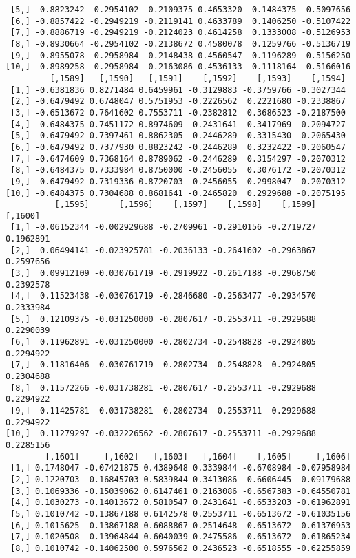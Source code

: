 \documentclass[
  letterpaper,
  DIV=11,
  numbers=noendperiod]{scrreprt}
\begin{document}
\begin{verbatim}
 [5,] -0.8823242 -0.2954102 -0.2109375 0.4653320  0.1484375 -0.5097656
 [6,] -0.8857422 -0.2949219 -0.2119141 0.4633789  0.1406250 -0.5107422
 [7,] -0.8886719 -0.2949219 -0.2124023 0.4614258  0.1333008 -0.5126953
 [8,] -0.8930664 -0.2954102 -0.2138672 0.4580078  0.1259766 -0.5136719
 [9,] -0.8955078 -0.2958984 -0.2148438 0.4560547  0.1196289 -0.5156250
[10,] -0.8989258 -0.2958984 -0.2163086 0.4536133  0.1118164 -0.5166016
         [,1589]   [,1590]   [,1591]    [,1592]    [,1593]    [,1594]
 [1,] -0.6381836 0.8271484 0.6459961 -0.3129883 -0.3759766 -0.3027344
 [2,] -0.6479492 0.6748047 0.5751953 -0.2226562  0.2221680 -0.2338867
 [3,] -0.6513672 0.7641602 0.7553711 -0.2382812  0.3686523 -0.2187500
 [4,] -0.6484375 0.7451172 0.8974609 -0.2431641  0.3417969 -0.2094727
 [5,] -0.6479492 0.7397461 0.8862305 -0.2446289  0.3315430 -0.2065430
 [6,] -0.6479492 0.7377930 0.8823242 -0.2446289  0.3232422 -0.2060547
 [7,] -0.6474609 0.7368164 0.8789062 -0.2446289  0.3154297 -0.2070312
 [8,] -0.6484375 0.7333984 0.8750000 -0.2456055  0.3076172 -0.2070312
 [9,] -0.6479492 0.7319336 0.8720703 -0.2456055  0.2998047 -0.2070312
[10,] -0.6484375 0.7304688 0.8681641 -0.2465820  0.2929688 -0.2075195
          [,1595]      [,1596]    [,1597]    [,1598]    [,1599]   [,1600]
 [1,] -0.06152344 -0.002929688 -0.2709961 -0.2910156 -0.2719727 0.1962891
 [2,]  0.06494141 -0.023925781 -0.2036133 -0.2641602 -0.2963867 0.2597656
 [3,]  0.09912109 -0.030761719 -0.2919922 -0.2617188 -0.2968750 0.2392578
 [4,]  0.11523438 -0.030761719 -0.2846680 -0.2563477 -0.2934570 0.2333984
 [5,]  0.12109375 -0.031250000 -0.2807617 -0.2553711 -0.2929688 0.2290039
 [6,]  0.11962891 -0.031250000 -0.2802734 -0.2548828 -0.2924805 0.2294922
 [7,]  0.11816406 -0.030761719 -0.2802734 -0.2548828 -0.2924805 0.2304688
 [8,]  0.11572266 -0.031738281 -0.2807617 -0.2553711 -0.2929688 0.2294922
 [9,]  0.11425781 -0.031738281 -0.2802734 -0.2553711 -0.2929688 0.2294922
[10,]  0.11279297 -0.032226562 -0.2807617 -0.2553711 -0.2929688 0.2285156
        [,1601]     [,1602]   [,1603]   [,1604]    [,1605]     [,1606]
 [1,] 0.1748047 -0.07421875 0.4389648 0.3339844 -0.6708984 -0.07958984
 [2,] 0.1220703 -0.16845703 0.5839844 0.3413086 -0.6606445  0.09179688
 [3,] 0.1069336 -0.15039062 0.6147461 0.2163086 -0.6567383 -0.64550781
 [4,] 0.1030273 -0.14013672 0.5810547 0.2431641 -0.6533203 -0.61962891
 [5,] 0.1010742 -0.13867188 0.6142578 0.2553711 -0.6513672 -0.61035156
 [6,] 0.1015625 -0.13867188 0.6088867 0.2514648 -0.6513672 -0.61376953
 [7,] 0.1020508 -0.13964844 0.6040039 0.2475586 -0.6513672 -0.61865234
 [8,] 0.1010742 -0.14062500 0.5976562 0.2436523 -0.6518555 -0.62255859

\end{verbatim}
\end{document}
